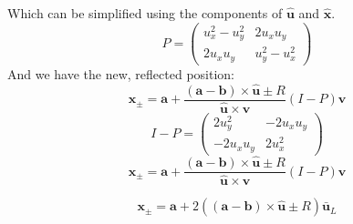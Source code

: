 \documentclass[12pt]{article}
\begin{document}
Which can be simplified using the components of $\mathbf{\hat u}$ and $\mathbf{\hat x}$.
\begin{equation}
	P = \left(\begin{matrix}
		u_x^2 - u_y^2 & 2 u_x u_y \\
		2 u_x u_y & u_y^2-u_x^2
	\end{matrix}\right)
\end{equation}
And we have the new, reflected position: 
\begin{equation}
	\mathbf x_{\pm}=  \mathbf a + \frac{(\mathbf a- \mathbf  b)\times \mathbf{\hat u} \pm R}{\mathbf{\hat u} \times \mathbf v}
(I - P) \mathbf v
\end{equation}
\begin{equation}
	I-P = \left(\begin{matrix}
		2u_y^2 & -2u_xu_y \\
		-2u_xu_y& 2u_x^2
	\end{matrix}\right) 
\end{equation}
\begin{equation}
	\mathbf x_{\pm}=  \mathbf a + \frac{(\mathbf a- \mathbf  b)\times \mathbf{\hat u} \pm R}{\mathbf{\hat u} \times \mathbf v}
(I - P) \mathbf v
\end{equation}

\begin{equation}
	\mathbf x_{\pm}=  \mathbf a + 2((\mathbf a- \mathbf  b)\times \mathbf{\hat u} \pm R) \mathbf{\bar u}_{L}
\end{equation}
\end{document}
